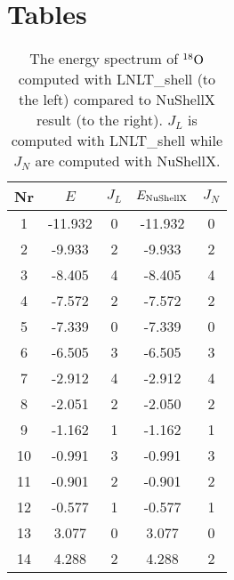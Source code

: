 \section{Tables}

\begin{table}[H]
\centering
\caption{The energy spectrum of $^{18}\rm{O}$ computed with LNLT\_shell (to the left) compared to NuShellX result (to the right). \(J_L\) is computed with LNLT\_shell while \(J_N\) are computed with NuShellX.}
\label{tab:ox18}
\begin{tabular}{c|cc|cc}
\hline Nr & \(E\) & \(J_{L}\) & \(E_{\rm{NuShellX}}\) & \(J_{N}\) \\
\hline 1   & -11.932 &       0 & -11.932 & 0 \\
 2   &  -9.933 &       2 & -9.933 & 2 \\
 3   &  -8.405 &       4 & -8.405 & 4 \\
 4   &  -7.572 &       2 & -7.572 & 2 \\
 5   &  -7.339 &       0 & -7.339 & 0 \\
 6   &  -6.505 &       3 & -6.505 & 3 \\
 7   &  -2.912 &       4 & -2.912 & 4 \\
 8   &  -2.051 &       2 & -2.050 & 2 \\
 9   &  -1.162 &       1 & -1.162 & 1 \\
 10  &  -0.991 &       3 & -0.991 & 3 \\
 11  &  -0.901 &       2 & -0.901 & 2 \\
 12  &  -0.577 &       1 & -0.577 & 1 \\
 13  &   3.077 &       0 & 3.077 & 0 \\
 14  &   4.288 &       2 & 4.288 & 2 \\
\hline
\end{tabular}
\end{table}

